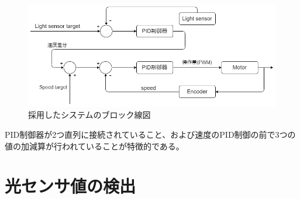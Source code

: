 \documentclass{ltjsreport}
\begin{document}
\begin{figure}[H]
  \centering
  \includegraphics[keepaspectratio, scale=0.5]
       {img/block_line.drawio.png}
  \caption{採用したシステムのブロック線図}
  \label{fig:blockline}
 \end{figure}

PID制御器が2つ直列に接続されていること、および速度のPID制御の前で3つの値の加減算が行われていることが特徴的である。


\section{光センサ値の検出}
\end{document}
